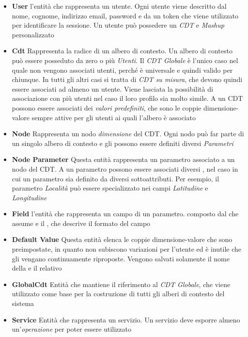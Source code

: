 \begin{itemize}
	\item \textbf{User}
	\upe l'entità che rappresenta un utente. Ogni utente viene descritto dal nome, cognome, indirizzo email, password e da un token che viene utilizzato per identificare la sessione. Un utente può possedere un \emph{CDT} e \emph{Mashup} personalizzato
	\item \textbf{Cdt}
	Rappresenta la radice di un albero di contesto. Un albero di contesto può essere posseduto da zero o più \emph{Utenti}. Il \emph{CDT Globale} è l'unico caso nel quale non vengono associati utenti, perché è universale e quindi valido per chiunque. In tutti gli altri casi si tratta di \emph{CDT su misura}, che devono quindi essere associati ad almeno un utente. Viene lasciata la possibilità di associazione con più utenti nel caso il loro profilo sia molto simile. A un CDT possono essere associati dei \emph{valori predefiniti}, che sono le coppie dimensione-valore sempre attive per gli utenti ai quali l'albero è associato
	\item \textbf{Node}
	Rappresenta un nodo \emph{dimensione} del CDT. Ogni nodo può far parte di un singolo albero di contesto e gli possono essere definiti diversi \emph{Parametri}
	\item \textbf{Node Parameter}
	Questa entità rappresenta un parametro associato a un nodo del CDT. A un parametro possono essere associati diversi , nel caso in cui un parametro sia definito da diversi sottoattributi. Per esempio, il parametro \emph{Località} può essere specializzato nei campi \emph{Latitudine} e \emph{Longitudine}
	\item \textbf{Field}
	\upe l'entità che rappresenta un campo di un parametro. \upe composto dal  che assume e il , che descrive il formato del campo
	\item \textbf{Default Value}
	Questa entità elenca le coppie dimensione-valore che sono preimpostate, in quanto non subiscono variazioni per l'utente ed è inutile che gli vengano continuamente riproposte. Vengono salvati solamente il nome della  e il relativo 
	\item \textbf{GlobalCdt}
	Entità che mantiene il riferimento al \emph{CDT Globale}, che viene utilizzato come base per la costruzione di tutti gli alberi di contesto del sistema
	\item \textbf{Service}
	Entità che rappresenta un servizio. Un servizio deve esporre almeno un'\emph{operazione} per poter essere utilizzato

\end{itemize}
